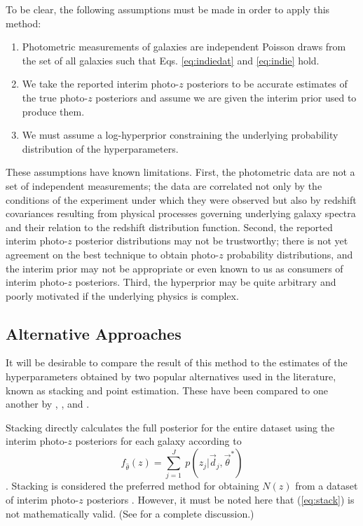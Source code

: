 \documentclass[preprint]{aastex}
\begin{document}
To be clear, the following assumptions must be made in order to apply this 
method:

\begin{enumerate}
\item Photometric measurements of galaxies are independent Poisson draws from 
the set of all galaxies such that Eqs. \ref{eq:indiedat} and \ref{eq:indie} 
hold.
\item We take the reported interim photo-$z$ posteriors to be accurate 
estimates of the true photo-$z$ posteriors and assume we are given the interim 
prior used to produce them.
\item We must assume a log-hyperprior constraining the underlying probability 
distribution of the hyperparameters.
\end{enumerate}

These assumptions have known limitations.  First, the photometric data are not 
a set of independent measurements; the data are correlated not only by the 
conditions of the experiment under which they were observed but also by 
redshift covariances resulting from physical processes governing underlying 
galaxy spectra and their relation to the redshift distribution function.  
Second, the reported interim photo-$z$ posterior distributions may not be 
trustworthy; there is not yet agreement on the best technique to obtain 
photo-$z$ probability distributions, and the interim prior may not be 
appropriate or even known to us as consumers of interim photo-$z$ posteriors.  
Third, the hyperprior may be quite arbitrary and poorly motivated if the 
underlying physics is complex.

\subsection{Alternative Approaches}
\label{sec:sheldon}

It will be desirable to compare the result of this method to the estimates of 
the hyperparameters obtained by two popular alternatives used in the 
literature, known as stacking and point estimation.   These have been compared 
to one another by \citet{Hildebrandt2012}, \citet{Benjamin2013}, and 
\citet{Asorey2016}.

Stacking directly calculates the full posterior for the entire dataset using 
the interim photo-$z$ posteriors for each galaxy according to 
\begin{equation}
\label{eq:stack}
f_{\hat{\theta}}(z) = \sum_{j=1}^{J}\ p(z_{j}|\vec{d}_{j},\vec{\theta}^{*})
\end{equation}
\citep{Lima2008}.  Stacking is considered the preferred method for obtaining 
$N(z)$ from a dataset of interim photo-$z$ posteriors \citep{Sheldon2012, 
Kelly2014, Benjamin2013, Bonnett2015a, Viironen2015, Asorey2016}.  However, it 
must be noted here that (\ref{eq:stack}) is not mathematically valid.  (See 
\citet{Hogg2012} for a complete discussion.)  
\end{document}

